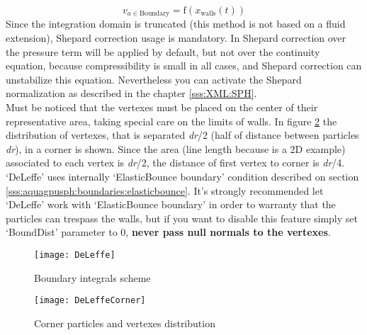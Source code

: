 \[
v_{a \in \mathrm{Boundary}} = \mathrm{f}\left(x_\mathrm{walls} \left( t \right) \right)
\]
%
Since the integration domain is truncated (this method is not based on a fluid extension), Shepard correction usage
is mandatory. In \NAME Shepard correction over the pressure term will be applied by default, but not over the
continuity equation, because compressibility is small in all cases, and Shepard correction can unstabilize this
equation. Nevertheless you can activate the Shepard normalization as described in the chapter \ref{sss:XML:SPH}.\\
%
Must be noticed that the vertexes must be placed on the center of their representative area, taking special care on
the limits of walls. In figure \ref{fig:aquagpusph:DeLeffeCorner} the distribution of vertexes, that is separated 
\textit{dr}/2 (half of distance between particles \textit{dr}), in a corner is shown. Since the area (line length
because is a 2D example) associated to each vertex is \textit{dr}/2, the distance of first vertex to corner is
\textit{dr}/4.\\
%
`DeLeffe' uses internally `ElasticBounce boundary' condition described on section
\ref{sss:aquagpusph:boundaries:elasticbounce}. It's strongly recommended let `DeLeffe' work with
`ElasticBounce boundary' in order to warranty that the particles can trespass the walls, but if you want to
disable this feature simply set `BoundDist' parameter to 0, \textbf{never pass null normals to the vertexes}.
%
\begin{figure}[h!]
  \centering
  \texttt{[image: DeLeffe]}
  \caption{Boundary integrals scheme}
  \label{fig:aquagpusph:DeLeffeScheme}
\end{figure}
%
\begin{figure}[h!]
  \centering
  \texttt{[image: DeLeffeCorner]}
  \caption{Corner particles and vertexes distribution}
  \label{fig:aquagpusph:DeLeffeCorner}
\end{figure}
%